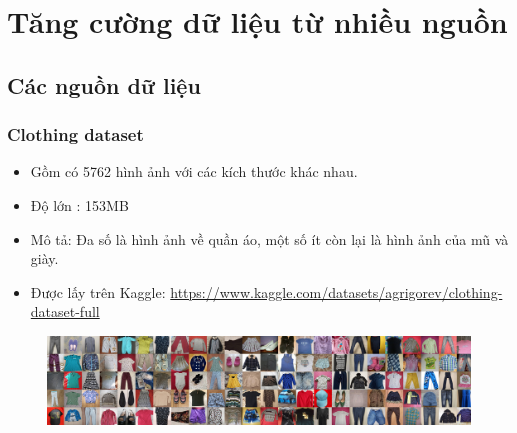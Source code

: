 \section{Tăng cường dữ liệu từ nhiều nguồn}
\subsection{Các nguồn dữ liệu}
\subsubsection{Clothing dataset}
\begin{itemize}
    \item Gồm có 5762 hình ảnh với các kích thước khác nhau.
    \item Độ lớn : 153MB
    \item Mô tả: Đa số là hình ảnh về quần áo, một số ít còn lại là hình ảnh của mũ và giày.
    \item Được lấy trên Kaggle: \href{https://www.kaggle.com/datasets/agrigorev/clothing-dataset-full}{https://www.kaggle.com/datasets/agrigorev/clothing-dataset-full}
\end{itemize}
\begin{center}
    \begin{figure}[!h]
       \centering
       \includegraphics[scale = 0.25]{fileanh/44.png}
     \end{figure}
\end{center}

